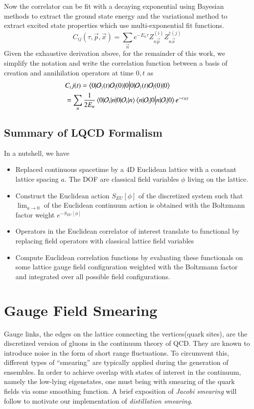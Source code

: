 Now the correlator can be fit with a decaying exponential using Bayesian methods to extract the ground state energy and the variational method to extract excited state properties which use multi-exponential fit functions. 
\begin{equation}
    C_{ij}(\tau,\vec{p},\vec{x}) = \sum_{\vec{n}}^{} e^{-E_n\tau} Z_{n\vec{p}}^{(i)} Z_{n\vec{x}}^{\dagger(j)}
\end{equation}
Given the exhaustive derivation above, for the remainder of this work, we simplify the notation and write the correlation function between a basis of creation and annihilation operators at time $0,t$ as \cite{Dudek_2010}
\begin{align}
    &C_ij(t) = \braket{0|\mathcal{O_i}(t)\mathcal{O_j}(0)|0} \\
    &= \sum_{n}^{} \frac{1}{2E_n}\braket{0|\mathcal{O}_i|n}\braket{n|\mathcal{O_j}|0}e^{-e_{NT}}    
\end{align}

\subsection{Summary of LQCD Formalism}
In a nutshell, we have 
\begin{itemize}
    \item Replaced continuous spacetime by a 4D Euclidean lattice with a constant lattice spacing $a$. The DOF are classical field variables $\phi$ living on the lattice.
    \item Construct the Euclidean action $S_{EU}[\phi]$ of the discretized system such that $\lim_{a \to 0}$ of the Euclidean continuum action is obtained with the Boltzmann factor weight $e^{-S_{EU}[\phi]}$ 
    \item Operators in the Euclidean correlator of interest translate to functional by replacing field operators with classical lattice field variables 
    \item Compute Euclidean correlation functions by evaluating these functionals on some lattice gauge field configuration weighted with the Boltzmann factor and integrated over all possible field configurations.
\end{itemize}

\section{Gauge Field Smearing}
Gauge links, the edges on the lattice connecting the vertices(quark sites), are the discretized version of gluons in the continuum theory of QCD. They are known to introduce noise in the form of short range fluctuations. To circumvent this, different types of ``smearing'' are typically applied during the generation of ensembles. In order to achieve overlap with states of interest in the continuum, namely the low-lying eigenstates, one must being with smearing of the quark fields via some smoothing function. A brief exposition of \textit{Jacobi smearing} will follow to motivate our implementation of \textit{distillation smearing}.

